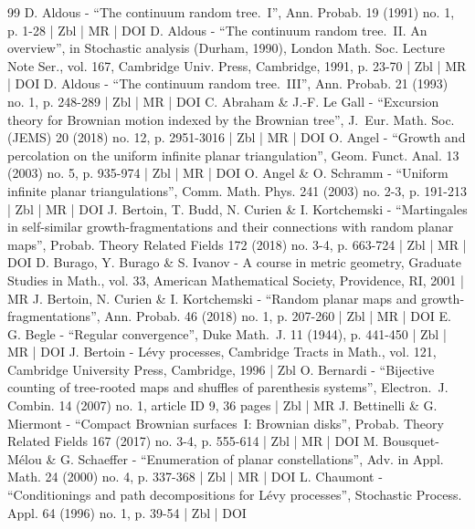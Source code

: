 \begin{thebibliography}{99}
D. Aldous - “The continuum random tree. I”, Ann. Probab. 19 (1991) no. 1, p. 1-28 | Zbl | MR | DOI
D. Aldous - “The continuum random tree. II. An overview”, in Stochastic analysis (Durham, 1990), London Math. Soc. Lecture Note Ser., vol. 167, Cambridge Univ. Press, Cambridge, 1991, p. 23-70 | Zbl | MR | DOI
D. Aldous - “The continuum random tree. III”, Ann. Probab. 21 (1993) no. 1, p. 248-289 | Zbl | MR | DOI
C. Abraham \& J.-F. Le Gall - “Excursion theory for Brownian motion indexed by the Brownian tree”, J. Eur. Math. Soc. (JEMS) 20 (2018) no. 12, p. 2951-3016 | Zbl | MR | DOI
O. Angel - “Growth and percolation on the uniform infinite planar triangulation”, Geom. Funct. Anal. 13 (2003) no. 5, p. 935-974 | Zbl | MR | DOI
O. Angel \& O. Schramm - “Uniform infinite planar triangulations”, Comm. Math. Phys. 241 (2003) no. 2-3, p. 191-213 | Zbl | MR | DOI
J. Bertoin, T. Budd, N. Curien \& I. Kortchemski - “Martingales in self-similar growth-fragmentations and their connections with random planar maps”, Probab. Theory Related Fields 172 (2018) no. 3-4, p. 663-724 | Zbl | MR | DOI
D. Burago, Y. Burago \& S. Ivanov - A course in metric geometry, Graduate Studies in Math., vol. 33, American Mathematical Society, Providence, RI, 2001 | MR
J. Bertoin, N. Curien \& I. Kortchemski - “Random planar maps and growth-fragmentations”, Ann. Probab. 46 (2018) no. 1, p. 207-260 | Zbl | MR | DOI
E. G. Begle - “Regular convergence”, Duke Math. J. 11 (1944), p. 441-450 | Zbl | MR | DOI
J. Bertoin - Lévy processes, Cambridge Tracts in Math., vol. 121, Cambridge University Press, Cambridge, 1996 | Zbl
O. Bernardi - “Bijective counting of tree-rooted maps and shuffles of parenthesis systems”, Electron. J. Combin. 14 (2007) no. 1, article ID 9, 36 pages | Zbl | MR
J. Bettinelli \& G. Miermont - “Compact Brownian surfaces I: Brownian disks”, Probab. Theory Related Fields 167 (2017) no. 3-4, p. 555-614 | Zbl | MR | DOI
M. Bousquet-Mélou \& G. Schaeffer - “Enumeration of planar constellations”, Adv. in Appl. Math. 24 (2000) no. 4, p. 337-368 | Zbl | MR | DOI
L. Chaumont - “Conditionings and path decompositions for Lévy processes”, Stochastic Process. Appl. 64 (1996) no. 1, p. 39-54 | Zbl | DOI

\end{thebibliography}
